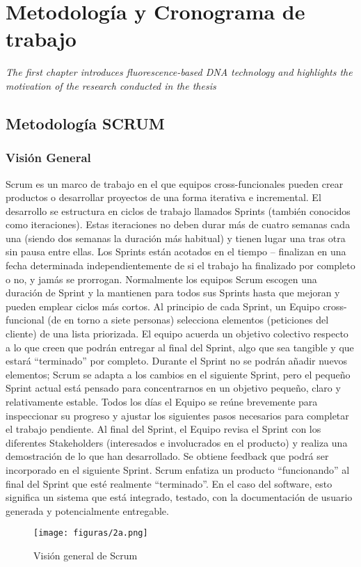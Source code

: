 \chapter{Metodología y Cronograma de trabajo}
\label{chap:coloso}
\textit{The first chapter introduces fluorescence-based DNA technology and highlights the motivation of the research conducted in the thesis}
\vfill
\minitoc
\newpage

\section{Metodología SCRUM}
\subsection{Visión General}
Scrum es un marco de trabajo en el que equipos cross-funcionales pueden crear productos o desarrollar proyectos de una forma iterativa e incremental. El desarrollo se estructura en ciclos de trabajo llamados Sprints (también conocidos como iteraciones). Estas iteraciones no deben durar más de cuatro semanas cada una (siendo dos semanas la duración más habitual) y tienen lugar una tras otra sin pausa entre ellas. Los Sprints están acotados en el tiempo – finalizan en una fecha determinada independientemente de si el trabajo ha finalizado por completo o no, y jamás se prorrogan. Normalmente los equipos Scrum escogen una duración de Sprint y la mantienen para todos sus Sprints hasta que mejoran y pueden emplear ciclos más cortos. Al principio de cada Sprint, un Equipo cross-funcional (de en torno a siete personas) selecciona elementos (peticiones del cliente) de una lista priorizada. El equipo acuerda un objetivo colectivo respecto a lo que creen que podrán entregar al final del Sprint, algo que sea tangible y que estará “terminado” por completo. Durante el Sprint no se podrán añadir nuevos elementos; Scrum se adapta a los cambios en el siguiente Sprint, pero el pequeño Sprint actual está pensado para concentrarnos en un objetivo pequeño, claro y relativamente estable. Todos los días el Equipo se reúne brevemente para inspeccionar su progreso y ajustar los siguientes pasos necesarios para completar el trabajo pendiente. Al final del Sprint, el Equipo revisa el Sprint con los diferentes Stakeholders (interesados e involucrados en el producto) y realiza una demostración de lo que han desarrollado. Se obtiene feedback que podrá ser incorporado en el siguiente Sprint. Scrum enfatiza un producto “funcionando” al final del Sprint que esté realmente “terminado”. En el caso del software, esto significa un sistema que está integrado, testado, con la documentación de usuario generada y potencialmente entregable.
  \begin{figure}[!h]
  	\centering
  	\texttt{[image: figuras/2a.png]}
  	\captionsetup{width=.95\textwidth}
  	\caption{Visión general de Scrum}
  	\label{figura2a}
  \end{figure}

